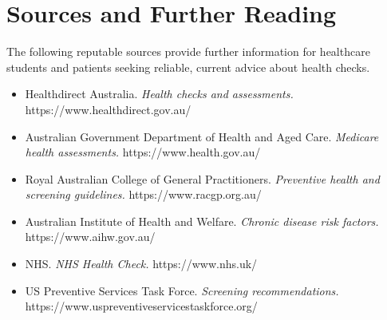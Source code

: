 \section*{Sources and Further Reading}
The following reputable sources provide further information for healthcare students and patients seeking reliable, current advice about health checks.

\begin{itemize}
    \item Healthdirect Australia. \textit{Health checks and assessments.} https://www.healthdirect.gov.au/
    \item Australian Government Department of Health and Aged Care. \textit{Medicare health assessments.} https://www.health.gov.au/
    \item Royal Australian College of General Practitioners. \textit{Preventive health and screening guidelines.} https://www.racgp.org.au/
    \item Australian Institute of Health and Welfare. \textit{Chronic disease risk factors.} https://www.aihw.gov.au/
    \item NHS. \textit{NHS Health Check.} https://www.nhs.uk/
    \item US Preventive Services Task Force. \textit{Screening recommendations.} https://www.uspreventiveservicestaskforce.org/
\end{itemize}
